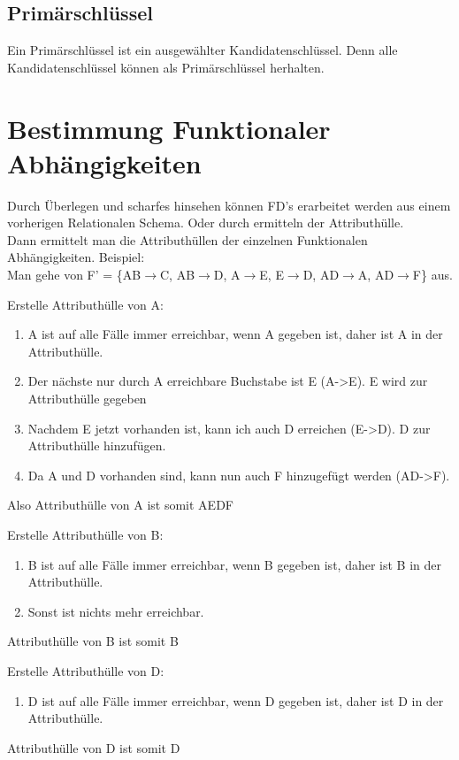 \subsection{Primärschlüssel}
Ein Primärschlüssel ist ein ausgewählter Kandidatenschlüssel. Denn alle Kandidatenschlüssel können als Primärschlüssel herhalten. 
\section{Bestimmung Funktionaler Abhängigkeiten}
Durch Überlegen und scharfes hinsehen können FD's erarbeitet werden aus einem vorherigen Relationalen Schema. Oder durch ermitteln der Attributhülle. \\
Dann ermittelt man die Attributhüllen der einzelnen Funktionalen Abhängigkeiten. Beispiel:\\
Man gehe von F' = \{AB$\rightarrow$C, AB$\rightarrow$D, A$\rightarrow$E, E$\rightarrow$D, AD$\rightarrow$A, AD$\rightarrow$F\} aus.

Erstelle Attributhülle von A:
\begin{enumerate}
\item  A ist auf alle Fälle immer erreichbar, wenn A gegeben ist, daher ist A in der Attributhülle.
\item Der nächste nur durch A erreichbare Buchstabe ist E (A->E). E wird zur Attributhülle gegeben
\item Nachdem E jetzt vorhanden ist, kann ich auch D erreichen (E->D). D zur Attributhülle hinzufügen.
\item Da A und D vorhanden sind, kann nun auch F hinzugefügt werden (AD->F).

\end{enumerate}

Also Attributhülle von A ist somit AEDF


Erstelle Attributhülle von B:
\begin{enumerate}
\item  B ist auf alle Fälle immer erreichbar, wenn B gegeben ist, daher ist B in der Attributhülle.
\item  Sonst ist nichts mehr erreichbar.
\end{enumerate}
 

Attributhülle von B ist somit B


Erstelle Attributhülle von D:
\begin{enumerate}
\item D ist auf alle Fälle immer erreichbar, wenn D gegeben ist, daher ist D in der Attributhülle.
\end{enumerate}
Attributhülle von D ist somit D

